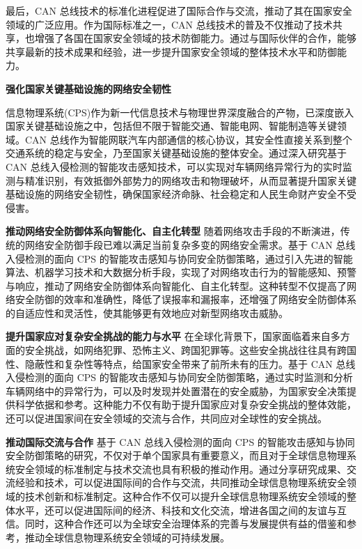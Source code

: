 最后，CAN 总线技术的标准化进程促进了国际合作与交流，推动了其在国家安全领域的广泛应用。作为国际标准之一，CAN 总线技术的普及不仅推动了技术共享，也增强了各国在国家安全领域的技术防御能力。通过与国际伙伴的合作，能够共享最新的技术成果和经验，进一步提升国家安全领域的整体技术水平和防御能力。

\textbf{强化国家关键基础设施的网络安全韧性}

信息物理系统(CPS)作为新一代信息技术与物理世界深度融合的产物，已深度嵌入国家关键基础设施之中，包括但不限于智能交通、智能电网、智能制造等关键领域。CAN 总线作为智能网联汽车内部通信的核心协议，其安全性直接关系到整个交通系统的稳定与安全，乃至国家关键基础设施的整体安全。通过深入研究基于 CAN 总线入侵检测的智能攻击感知技术，可以实现对车辆网络异常行为的实时监测与精准识别，有效抵御外部势力的网络攻击和物理破坏，从而显著提升国家关键基础设施的网络安全韧性，确保国家经济命脉、社会稳定和人民生命财产安全不受侵害。

\textbf{推动网络安全防御体系向智能化、自主化转型}
随着网络攻击手段的不断演进，传统的网络安全防御手段已难以满足当前复杂多变的网络安全需求。基于 CAN 总线入侵检测的面向 CPS 的智能攻击感知与协同安全防御策略，通过引入先进的智能算法、机器学习技术和大数据分析手段，实现了对网络攻击行为的智能感知、预警与响应，推动了网络安全防御体系向智能化、自主化转型。这种转型不仅提高了网络安全防御的效率和准确性，降低了误报率和漏报率，还增强了网络安全防御体系的自适应性和灵活性，使其能够更有效地应对新型网络攻击威胁。

\textbf{提升国家应对复杂安全挑战的能力与水平}
在全球化背景下，国家面临着来自多方面的安全挑战，如网络犯罪、恐怖主义、跨国犯罪等。这些安全挑战往往具有跨国性、隐蔽性和复杂性等特点，给国家安全带来了前所未有的压力。基于 CAN 总线入侵检测的面向 CPS 的智能攻击感知与协同安全防御策略，通过实时监测和分析车辆网络中的异常行为，可以及时发现并处置潜在的安全威胁，为国家安全决策提供科学依据和参考。这种能力不仅有助于提升国家应对复杂安全挑战的整体效能，还可以促进国家间在安全领域的交流与合作，共同应对全球性的安全挑战。

\textbf{推动国际交流与合作}
基于 CAN 总线入侵检测的面向 CPS 的智能攻击感知与协同安全防御策略的研究，不仅对于单个国家具有重要意义，而且对于全球信息物理系统安全领域的标准制定与技术交流也具有积极的推动作用。通过分享研究成果、交流经验和技术，可以促进国际间的合作与交流，共同推动全球信息物理系统安全领域的技术创新和标准制定。这种合作不仅可以提升全球信息物理系统安全领域的整体水平，还可以促进国际间的经济、科技和文化交流，增进各国之间的友谊与互信。同时，这种合作还可以为全球安全治理体系的完善与发展提供有益的借鉴和参考，推动全球信息物理系统安全领域的可持续发展。

